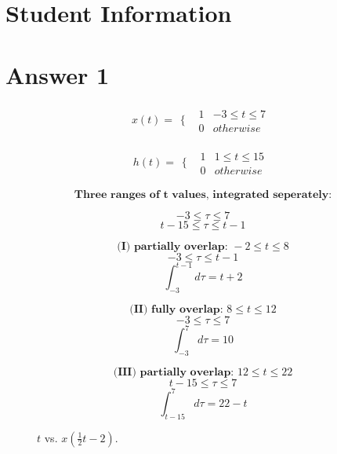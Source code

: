 \documentclass[12pt]{article}
\begin{document}
\section*{Student Information } 

\section*{Answer 1} 


\[
x(t) = 
\begin{array}{cc}
  \{ & 
    \begin{array}{cc}
      1 & -3 \leq t \leq 7 \\
      0 & otherwise
    \end{array}
\end{array}
\]

\[
h(t) =
\begin{array}{cc}
  \{ & 
    \begin{array}{cc}
      1 & 1 \leq t \leq 15 \\
      0 & otherwise
    \end{array}
\end{array}
\]

\[ \textbf{Three ranges of t values, integrated seperately:}\]

\[-3\leq \tau \leq 7\]
\[t-15\leq \tau \leq t-1\]

\[ \textbf{(I)   partially overlap: } -2\leq t \leq 8 \]
\[-3\leq \tau \leq t-1\]
\[\int_{-3}^{t-1}{d\tau} = t+2\]

\[ \textbf{(II)  fully overlap: } 8\leq t \leq 12 \]
\[-3\leq \tau \leq 7\]
\[\int_{-3}^{7}{d\tau} = 10\]

\[ \textbf{(III) partially overlap: } 12\leq t \leq 22 \]
\[t-15\leq \tau \leq 7\]
\[\int_{t-15}^{7}{d\tau} = 22-t\]

\begin{figure}[h!]
    \centering
        \caption{$t$ vs. $x(\frac{1}{2}t-2) $.}
        \label{fig:q2}
    \end{figure}
\end{document}

